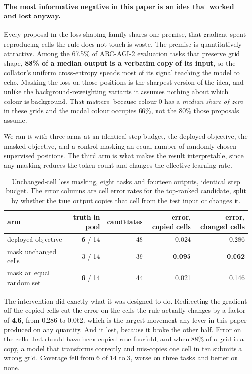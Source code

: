 \documentclass[11pt]{article}
\begin{document}
\paragraph{The most informative negative in this paper is an idea that worked and lost anyway.}
Every proposal in the loss-shaping family shares one premise, that gradient spent reproducing cells
the rule does not touch is waste. The premise is quantitatively attractive. Among the 67.5\% of
ARC-AGI-2 evaluation tasks that preserve grid shape, \textbf{88\% of a median output is a verbatim
copy of its input}, so the collator's uniform cross-entropy spends most of its signal teaching the
model to echo. Masking the loss on those positions is the sharpest version of the idea, and unlike
the background-reweighting variants it assumes nothing about which colour is background. That
matters, because colour 0 has a \emph{median share of zero} in these grids and the modal colour
occupies 66\%, not the 80\% those proposals assume.

We ran it with three arms at an identical step budget, the deployed objective, the masked objective,
and a control masking an equal number of randomly chosen supervised positions. The third arm is what
makes the result interpretable, since any masking reduces the token count and changes the effective
learning rate.

\begin{table}[H]
\centering
\small
\caption{Unchanged-cell loss masking, eight tasks and fourteen outputs, identical step budget. The
error columns are cell error rates for the top-ranked candidate, split by whether the true output
copies that cell from the test input or changes it.}
\label{tab:maskloss}
\begin{tabular}{@{}lrrrr@{}}
\toprule
arm & truth in pool & candidates & error, copied cells & error, changed cells \\
\midrule
deployed objective        & \textbf{6} / 14 & 48 & 0.024 & 0.286 \\
mask unchanged cells      & 3 / 14 & 39 & \textbf{0.095} & \textbf{0.062} \\
mask an equal random set  & \textbf{6} / 14 & 44 & 0.021 & 0.146 \\
\bottomrule
\end{tabular}
\end{table}

The intervention did exactly what it was designed to do. Redirecting the gradient off the copied
cells cut the error on the cells the rule actually changes by a factor of \textbf{4.6}, from 0.286 to
0.062, which is the largest movement any lever in this paper produced on any quantity. And it lost,
because it broke the other half. Error on the cells that should have been copied rose fourfold, and
when 88\% of a grid is a copy, a model that transforms correctly and mis-copies one cell in ten
submits a wrong grid. Coverage fell from 6 of 14 to 3, worse on three tasks and better on none.
\end{document}
